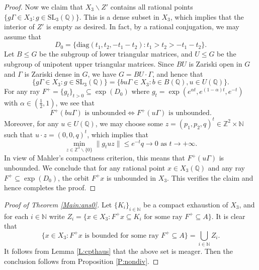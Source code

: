 \documentclass[reqno,12pt]{amsart}
\newtheorem{conjecture}[theorem]{Conjecture}
\theoremstyle{definition}
\numberwithin{equation}{section}
\newcommand{\NN}{\mathbb{N}}
\newcommand{\QQ}{\mathbb{Q}}
\newcommand{\ZZ}{\mathbb{Z}}
\newcommand{\diag}{\mathrm{diag}}
\newcommand{\SL}{\mathrm{SL}}
\newcommand{\Ad}{\mathrm{Ad}}
\newcommand {\ignore}[1]  {}
\newcommand {\comm}[1]   {\textcolor{red}{#1}}
\renewcommand{\setminus}{\smallsetminus}
\begin{document}
{\begin{proof}
Now we claim that $X_3\setminus Z'$ contains all rational points $\{g\Gamma\in X_3:g\in\SL_3(\QQ)\}$. This is a dense subset in $X_3$, which implies that the interior of $Z'$ is empty as desired. In fact, by a rational conjugation, we may assume that $$
D_0=\{\diag(t_1,t_2,-t_1-t_2):t_1>t_2>-t_1-t_2\}.
$$
Let $B\leq G$ be the subgroup of lower triangular matrices, and $U\leq G$ be the subgroup of unipotent upper triangular matrices. Since $BU$ is Zariski open in $G$ and $\Gamma$ is Zariski dense in $G$, we have $G=BU\cdot \Gamma$, and hence that $$\{g\Gamma\in X_3:g\in\SL_3(\QQ)\}
=\{bu\Gamma\in X_3:b\in B(\QQ),u\in U(\QQ)\}.$$
For any ray $F^+=\{g_t\}_{t>0}\subseteq \exp(D_0)$ where $g_t=\exp(e^{\alpha t},e^{(1-\alpha)t},e^{-t})$ with $\alpha\in (\frac{1}{2},1)$, we see that $$
F^+(bu\Gamma)\text{ is unbounded}\Longleftrightarrow F^+(u\Gamma)\text{ is unbounded}.
$$
Moreover, for any $u\in U(\QQ)$, we may choose some $z=(p_1,p_2,q)^t\in\ZZ^2\times \NN$ such that $u\cdot z=(0,0,q)^t$, which implies that $$
\min_{z\in \ZZ^3\setminus \{0\}}\|g_tuz\|\leq e^{-t}q\to 0\text{ as }t\to +\infty.
$$
In view of Mahler's compactness criterion, this means that $F^+(u\Gamma)$ is unbounded. We conclude that for any rational point $x\in X_3(\QQ)$ and any ray $F^+\subseteq \exp(D_0)$, the orbit $F^+x$ is unbounded in $X_3$. This verifies the claim and hence completes the proof.
\end{proof}

\begin{proof}[Proof of Theorem \ref{Main:ans0}] Let $\{K_i\}_{i\in\NN}$ be a compact exhaustion of $X_3$, and for each $i\in\NN$ write $Z_i=\{x\in X_3:F^+x\subseteq K_i\text{ for some ray }F^+\subseteq A\}$. It is clear that $$
\{x\in X_3:F^+x\text{ is bounded for some ray }F^+\subseteq A\}=\bigcup_{i\in\NN}Z_i.
$$
It follows from Lemma \ref{L:cpthaus} that the above set is meager.
Then the conclusion follows from Proposition \ref{P:nondiv}. 
\end{proof}


\ignore{\section{Concluding remarks}
Capitalizing on Theorems \ref{MainThm00} and \ref{MainThm1}, we can propose the following two conjectures:

\begin{conjecture}\label{MainConj}
	Let $X=G/\Gamma$ be a homogeneous space, where $G$ is a {semisimple} Lie group and $\Gamma$ is {an irreducible}  lattice. Let $F_1\neq F_2$ be two commuting 
$\Ad$-diagonalizable one-parameter subgroups in $G$. Then the set $Eq(F_1)\cap B(F_2)$ is thick in $X$. %
\end{conjecture}


}}
\end{document}
